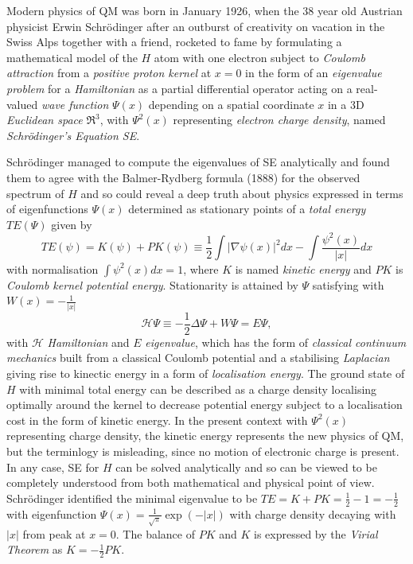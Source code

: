 \documentclass[11pt]{article} %
\begin{document}
Modern physics of QM was born in January 1926,  when the 38 year old Austrian physicist Erwin Schr\"odinger after an outburst of creativity on vacation in the Swiss Alps together with a friend,  rocketed to fame by formulating a mathematical model of the $H$ atom with one electron subject to \emph{Coulomb attraction} from a \emph{positive proton kernel} at $x=0$ in the form of an \emph{eigenvalue problem} for a \emph{Hamiltonian} as a partial differential operator acting on a real-valued \emph{wave function} $\Psi (x)$ depending on a spatial coordinate $x$ in a 3D \emph{Euclidean space} $\Re^3$,  with $\Psi^2(x)$ representing \emph{electron charge density},  named \emph{Schr\"odinger's Equation SE}. 

Schr\"odinger managed to compute the eigenvalues of SE analytically and found them to agree with the Balmer-Rydberg formula (1888) for the observed spectrum of $H$ and so could reveal a deep truth about physics expressed in terms of eigenfunctions $\Psi (x)$ determined as stationary points of a \emph{total energy} $TE(\Psi )$ given by
\begin{equation}
TE(\psi ) = K(\psi )+PK(\psi ) \equiv \frac{1}{2}\int\vert\nabla\psi (x)\vert^2dx -\int \frac{\psi^2(x)}{\vert x\vert}dx
\end{equation}
 with normalisation $\int\psi^2(x)dx=1$,  where $K$ is named \emph{kinetic energy} and $PK$ is \emph{Coulomb kernel potential energy}.  Stationarity is attained by $\Psi$ satisfying with $W(x)=-\frac{1}{\vert x\vert}$
\begin{equation}
\mathcal{H}\Psi\equiv  -\frac{1}{2}\Delta\Psi +W\Psi = E\Psi, 
\end{equation}
with $\mathcal{H}$ \emph{Hamiltonian} and $E$ \emph{eigenvalue},  which has the form of \emph{classical continuum mechanics} built from a classical Coulomb potential and a stabilising \emph{Laplacian} giving rise to kinectic energy in a form of  \emph{localisation energy}.  The ground state of $H$ with minimal total energy can be described as a charge density localising optimally around the kernel to decrease potential energy subject to a localisation cost in the form of kinetic energy.  In the present context with $\Psi^2(x)$ representing charge density,  the kinetic energy represents the new physics of QM,  but the terminlogy is misleading,  since no motion of electronic charge  is present.  In any case,  SE for $H$ can be solved analytically and so can be viewed to be completely understood from both mathematical and physical point of view.  Schr\"odinger identified the minimal eigenvalue to be $TE=K+PK=\frac{1}{2}-1=-\frac{1}{2}$ with eigenfunction $\Psi (x)=\frac{1}{\sqrt{\pi}}\exp(-\vert x\vert)$ with charge density decaying with $\vert x\vert$ from peak at $x=0$.  The balance of $PK$ and $K$ is expressed by the \emph{Virial Theorem} as $K =-\frac{1}{2}PK$. 
\end{document}
